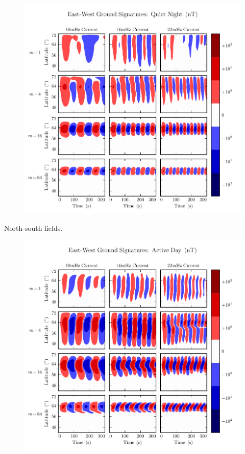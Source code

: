 \begin{figure}[H]
    \centering
    \includegraphics[width=\textwidth]{figures/BfE_J_4.pdf}
    \caption[East-West Ground Signatures: Quiet Night]{}
    \label{fig_BfE_J_4}
\end{figure}

North-south fields. 


\begin{figure}[H]
    \centering
    \includegraphics[width=\textwidth]{figures/BfE_J_1.pdf}
    \caption[North-South Ground Signatures: Active Day]{}
    \label{fig_BqE_J_1}
\end{figure}

